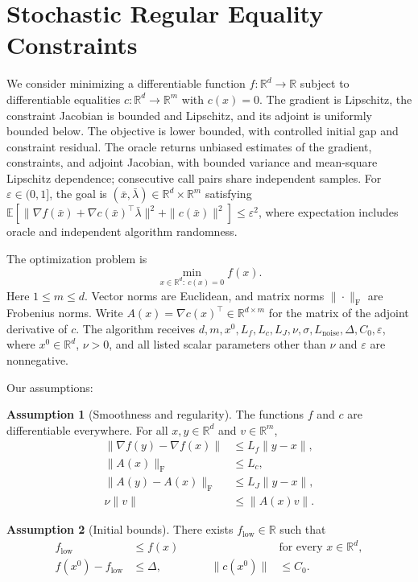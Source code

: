 \documentclass[10pt]{article}
\theoremstyle{definition}
\newtheorem{assumption}{Assumption}
\begin{document}
\section*{Stochastic Regular Equality Constraints}
We consider minimizing a differentiable function $f:\mathbb{R}^d\to\mathbb{R}$ subject to differentiable equalities $c:\mathbb{R}^d\to\mathbb{R}^m$ with $c(x)=0$. The gradient is Lipschitz, the constraint Jacobian is bounded and Lipschitz, and its adjoint is uniformly bounded below. The objective is lower bounded, with controlled initial gap and constraint residual. The oracle returns unbiased estimates of the gradient, constraints, and adjoint Jacobian, with bounded variance and mean-square Lipschitz dependence; consecutive call pairs share independent samples. For $\varepsilon\in(0,1]$, the goal is $(\bar{x},\bar{\lambda})\in\mathbb{R}^d\times\mathbb{R}^m$ satisfying $\mathbb{E}[\|\nabla f(\bar{x})+\nabla c(\bar{x})^\top\bar{\lambda}\|^2+\|c(\bar{x})\|^2]\leq\varepsilon^2$, where expectation includes oracle and independent algorithm randomness.

The optimization problem is
\[
\min_{x\in\mathbb{R}^d:\ c(x)=0} f(x).
\]
Here $1\leq m\leq d$. Vector norms are Euclidean, and matrix norms $\|\cdot\|_{\mathrm F}$ are Frobenius norms. Write $A(x)=\nabla c(x)^\top\in\mathbb{R}^{d\times m}$ for the matrix of the adjoint derivative of $c$. The algorithm receives $d,m,x^0,L_f,L_c,L_J,\nu,\sigma,L_{\mathrm{noise}},\Delta,C_0,\varepsilon$, where $x^0\in\mathbb{R}^d$, $\nu>0$, and all listed scalar parameters other than $\nu$ and $\varepsilon$ are nonnegative.

Our assumptions:
\begin{assumption}[Smoothness and regularity]
The functions $f$ and $c$ are differentiable everywhere. For all $x,y\in\mathbb{R}^d$ and $v\in\mathbb{R}^m$,
\[
\begin{aligned}
\|\nabla f(y)-\nabla f(x)\|&\leq L_f\|y-x\|,\\
\|A(x)\|_{\mathrm F}&\leq L_c,\\
\|A(y)-A(x)\|_{\mathrm F}&\leq L_J\|y-x\|,\\
\nu\|v\|&\leq\|A(x)v\|.
\end{aligned}
\]
\end{assumption}

\begin{assumption}[Initial bounds]
There exists $f_{\mathrm{low}}\in\mathbb{R}$ such that
\[
\begin{aligned}
f_{\mathrm{low}}&\leq f(x) &&\text{for every }x\in\mathbb{R}^d,\\
f(x^0)-f_{\mathrm{low}}&\leq\Delta, &\qquad \|c(x^0)\|&\leq C_0.
\end{aligned}
\]
\end{assumption}
\end{document}
